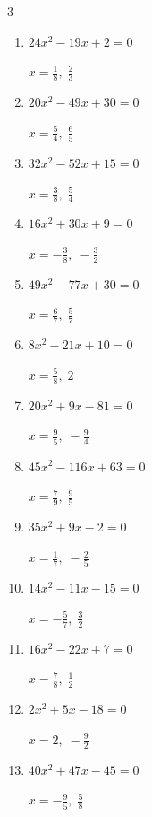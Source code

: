 \begin{multicols}{3}
\begin{enumerate}
  \item $24x^{2}-19x+2=0$

        $\displaystyle x=\frac{1}{8},\; \frac{2}{3}$

  \item $20x^{2}-49x+30=0$

        $\displaystyle x=\frac{5}{4},\; \frac{6}{5}$

  \item $32x^{2}-52x+15=0$

        $\displaystyle x=\frac{3}{8},\; \frac{5}{4}$

  \item $16x^{2}+30x+9=0$

        $\displaystyle x=-\frac{3}{8},\; -\frac{3}{2}$

  \item $49x^{2}-77x+30=0$

        $\displaystyle x=\frac{6}{7},\; \frac{5}{7}$

  \item $8x^{2}-21x+10=0$

        $\displaystyle x=\frac{5}{8},\; 2$

  \item $20x^{2}+9x-81=0$

        $\displaystyle x=\frac{9}{5},\; -\frac{9}{4}$

\columnbreak %

  \item $45x^{2}-116x+63=0$

        $\displaystyle x=\frac{7}{9},\; \frac{9}{5}$

  \item $35x^{2}+9x-2=0$

        $\displaystyle x=\frac{1}{7},\; -\frac{2}{5}$

  \item $14x^{2}-11x-15=0$

        $\displaystyle x=-\frac{5}{7},\; \frac{3}{2}$

  \item $16x^{2}-22x+7=0$

        $\displaystyle x=\frac{7}{8},\; \frac{1}{2}$

  \item $2x^{2}+5x-18=0$

        $\displaystyle x=2,\; -\frac{9}{2}$

  \item $40x^{2}+47x-45=0$

        $\displaystyle x=-\frac{9}{5},\; \frac{5}{8}$


\end{enumerate}
\end{multicols}
